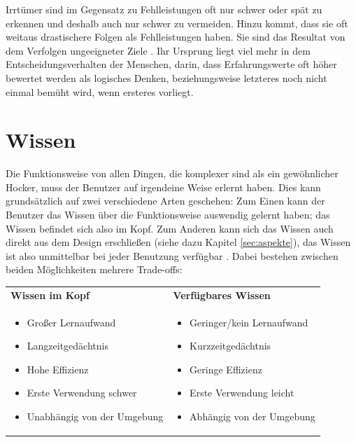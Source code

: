 \documentclass[parskip,headsepline, headtopline, %
footsepline, oneside, 12pt, headings=small]{scrreprt}
\begin{document}
Irrtümer sind im Gegensatz zu Fehlleistungen oft nur schwer oder spät zu erkennen und deshalb auch nur schwer zu vermeiden. Hinzu kommt, dass sie oft weitaus drastischere Folgen als Fehlleistungen haben. Sie sind das Resultat von dem Verfolgen ungeeigneter Ziele \cite[S. 114]{don}. Ihr Ursprung liegt viel mehr in dem Entscheidungsverhalten der Menschen, darin, dass Erfahrungswerte oft höher bewertet werden als logisches Denken, beziehungsweise letzteres noch nicht einmal bemüht wird, wenn ersteres vorliegt.

\section{Wissen}

Die Funktionsweise von allen Dingen, die komplexer sind als ein gewöhnlicher Hocker, muss der Benutzer auf irgendeine Weise erlernt haben. Dies kann grundsätzlich auf zwei verschiedene Arten geschehen: Zum Einen kann der Benutzer das Wissen über die Funktionsweise auswendig gelernt haben; das Wissen befindet sich also im Kopf. Zum Anderen kann sich das Wissen auch direkt aus dem Design erschließen (siehe dazu Kapitel \ref{sec:aspekte}), das Wissen ist also unmittelbar bei jeder Benutzung verfügbar \cite[S. 54ff]{don}. 
Dabei bestehen zwischen beiden Möglichkeiten mehrere Trade-offs:

\begin{tabular}{|p{}|p{}|}\hline\vspace{6pt}
\hspace{1cm}\textbf{Wissen im Kopf} & \vspace{6pt}\hspace{1cm}\textbf{Verfügbares Wissen}\\
\begin{itemize}
\item Großer Lernaufwand
\item Langzeitgedächtnis
\item Hohe Effizienz
\item Erste Verwendung schwer
\item Unabhängig von der Umgebung
\end{itemize} &
\begin{itemize}
\item Geringer/kein Lernaufwand
\item Kurzzeitgedächtnis
\item Geringe Effizienz
\item Erste Verwendung leicht
\item Abhängig von der Umgebung
\end{itemize}
\\\hline
\end{tabular}
\end{document}
